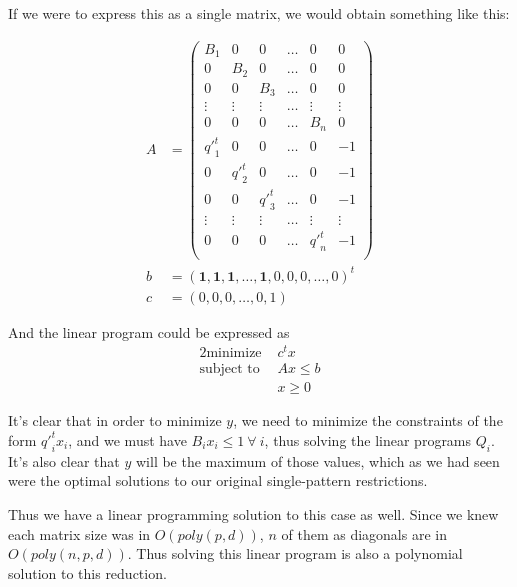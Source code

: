 If we were to express this as a single matrix, we would obtain something like this:

\begin{align*}
A &= \begin{pmatrix}
B_1 & 0   & 0   & \dots & 0 & 0\\
0   & B_2 & 0   & \dots & 0 & 0\\
0   & 0   & B_3 & \dots & 0 & 0\\
\vdots & \vdots & \vdots & \dots & \vdots & \vdots\\
0 & 0 & 0 & \dots & B_n & 0\\
{q'}_1^t & 0 & 0 & \dots & 0 & -1\\
0 & {q'}_2^t & 0 & \dots & 0 & -1\\
0 & 0 & {q'}_3^t & \dots & 0 & -1\\
\vdots & \vdots & \vdots & \dots & \vdots & \vdots\\
0 & 0 & 0 & \dots & {q'}_n^t & -1\\
\end{pmatrix}\\
b &= (\mathbf{1}, \mathbf{1}, \mathbf{1}, \dots, \mathbf{1}, 0, 0, 0, \dots, 0)^t\\
c &= (0, 0, 0, \dots, 0, 1)
\end{align*}

And the linear program could be expressed as
\begin{alignat*}{2}
  \text{minimize } & c^t x\\
  \text{subject to } & Ax \le b\\
                     & x \ge 0
\end{alignat*}


It's clear that in order to minimize $y$, we need to minimize the constraints of the form ${q'}_i^t x_i$, and we must have $B_i x_i \le 1\ \forall\ i$, thus solving the linear programs $Q_i$. It's also clear that $y$ will be the maximum of those values, which as we had seen were the optimal solutions to our original single-pattern restrictions.

Thus we have a linear programming solution to this case as well. Since we knew each matrix size was in $O(poly(p, d))$, $n$ of them as diagonals are in $O(poly(n, p, d))$. Thus solving this linear program is also a polynomial solution to this reduction.
